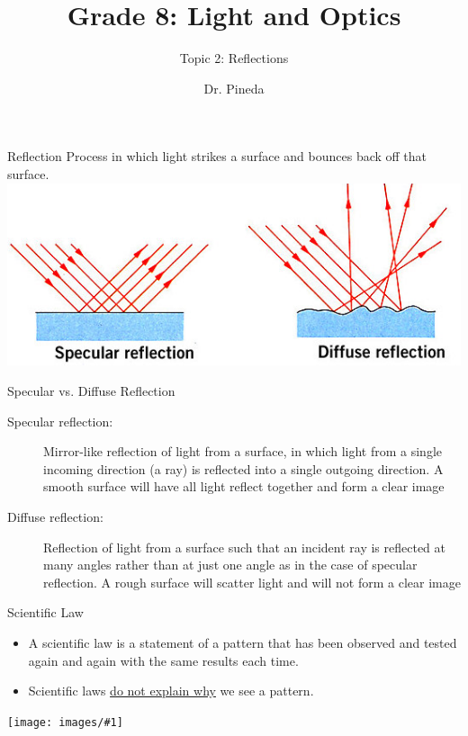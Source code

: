 \documentclass[t]{beamer}
\title[Topic 2]{Grade 8: Light and Optics} %
\subtitle{Topic 2: Reflections}
\author{Dr. Pineda}
\institute[] {\href{http://www.drpineda.ca}{www.drpineda.ca}}
\date{} %
\newcommand{\img}[1]{\texttt{[image: images/\#1]}}
\newcommand{\bi}{\begin{itemize}}
\newcommand{\ei}{\end{itemize}}
\begin{document}
{
\frame{\titlepage}
}


\begin{frame}{Reflection}
Process in which light strikes a surface and bounces back off that surface. 
\includegraphics[width=1\linewidth]{images/specularreflection.jpg}
\end{frame}

\begin{frame}{Specular vs. Diffuse Reflection}

\begin{description}
\item[Specular reflection:]  Mirror-like reflection of light from a surface, in which light from a single incoming direction (a ray) is reflected into a single outgoing direction. A smooth surface will have all light reflect together and form a clear image

\item[Diffuse reflection:]  Reflection of light from a surface such that an incident ray is reflected at many angles rather than at just one angle as in the case of specular reflection. A rough surface will scatter light and will not form a clear image
\end{description}
\end{frame}

\begin{frame}{Scientific Law}
\bi
\item A scientific law is a statement of a pattern that has been observed and tested again and again with the same results each time. \item Scientific laws \underline{do not explain why} we see a pattern.
\ei
\img{law-of-gravity-enforced.jpg}
\end{frame}
\end{document}
